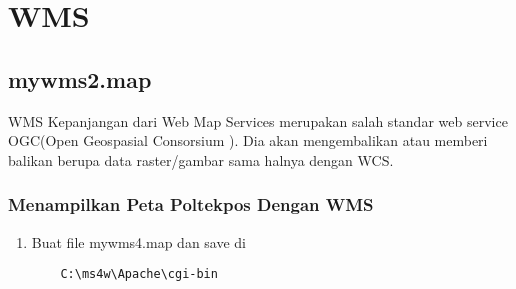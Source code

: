 \chapter{WMS}
\section{mywms2.map}
\par
WMS Kepanjangan dari Web Map Services merupakan salah standar web service OGC(Open Geospasial Consorsium ). Dia akan mengembalikan atau memberi balikan berupa data raster/gambar sama halnya dengan WCS.

\subsection{Menampilkan Peta Poltekpos Dengan WMS}
\begin{enumerate}
    \item Buat file mywms4.map dan save di
\begin{verbatim}
    C:\ms4w\Apache\cgi-bin
\end{verbatim}


\end{enumerate}
